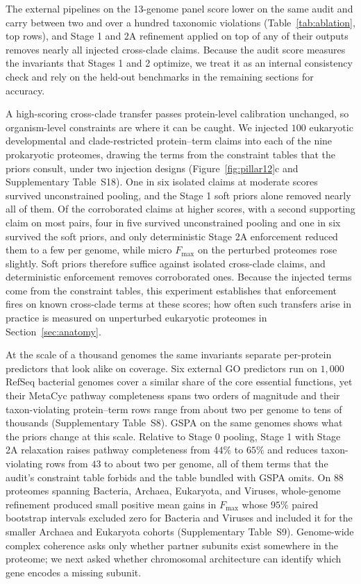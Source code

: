 \documentclass[10pt,twocolumn]{article}
\begin{document}
The external pipelines on the 13-genome panel score lower on the same audit and carry between two and over a hundred taxonomic violations (Table~\ref{tab:ablation}, top rows), and Stage 1 and 2A refinement applied on top of any of their outputs removes nearly all injected cross-clade claims. Because the audit score measures the invariants that Stages 1 and 2 optimize, we treat it as an internal consistency check and rely on the held-out benchmarks in the remaining sections for accuracy.

A high-scoring cross-clade transfer passes protein-level calibration unchanged, so organism-level constraints are where it can be caught. We injected $100$ eukaryotic developmental and clade-restricted protein--term claims into each of the nine prokaryotic proteomes, drawing the terms from the constraint tables that the priors consult, under two injection designs (Figure~\ref{fig:pillar12}c and Supplementary Table~S18). One in six isolated claims at moderate scores survived unconstrained pooling, and the Stage 1 soft priors alone removed nearly all of them. Of the corroborated claims at higher scores, with a second supporting claim on most pairs, four in five survived unconstrained pooling and one in six survived the soft priors, and only deterministic Stage 2A enforcement reduced them to a few per genome, while micro $F_{\max}$ on the perturbed proteomes rose slightly. Soft priors therefore suffice against isolated cross-clade claims, and deterministic enforcement removes corroborated ones. Because the injected terms come from the constraint tables, this experiment establishes that enforcement fires on known cross-clade terms at these scores; how often such transfers arise in practice is measured on unperturbed eukaryotic proteomes in Section~\ref{sec:anatomy}.

At the scale of a thousand genomes the same invariants separate per-protein predictors that look alike on coverage. Six external GO predictors run on $1{,}000$ RefSeq bacterial genomes cover a similar share of the core essential functions, yet their MetaCyc pathway completeness spans two orders of magnitude and their taxon-violating protein--term rows range from about two per genome to tens of thousands (Supplementary Table~S8). GSPA on the same genomes shows what the priors change at this scale. Relative to Stage 0 pooling, Stage 1 with Stage 2A relaxation raises pathway completeness from $44\%$ to $65\%$ and reduces taxon-violating rows from $43$ to about two per genome, all of them terms that the audit's constraint table forbids and the table bundled with GSPA omits. On $88$ proteomes spanning Bacteria, Archaea, Eukaryota, and Viruses, whole-genome refinement produced small positive mean gains in $F_{\max}$ whose $95\%$ paired bootstrap intervals excluded zero for Bacteria and Viruses and included it for the smaller Archaea and Eukaryota cohorts (Supplementary Table~S9). Genome-wide complex coherence asks only whether partner subunits exist somewhere in the proteome; we next asked whether chromosomal architecture can identify which gene encodes a missing subunit.
\end{document}

